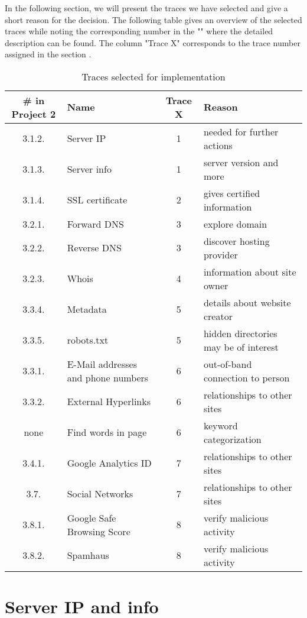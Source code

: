 \documentclass[
	a4paper,					10pt,							twoside,					openright,				notitlepage,			parskip=half,			]{scrreprt}
\begin{document}
In the following section, we will present the traces we have selected and give a short reason for the decision. 
The following table gives an overview of the selected traces while noting the
corresponding number in the "" where the detailed description
can be found. The column "Trace X" corresponds to the trace number assigned in the section . 
\begin{table}[H]
\begin{tabular}{ c | l | c | l }
\hline
\textbf{\# in Project 2} & \textbf{Name} & \textbf{Trace X} & \textbf{Reason} \\ \hline
3.1.2. & Server \gls{IP} & 1 & needed for further actions \\ \hline
3.1.3. & Server info & 1 & server version and more \\ \hline
3.1.4. & \gls{SSL} certificate & 2 & gives certified information \\ \hline
3.2.1. & Forward \gls{DNS} & 3 & explore domain \\ \hline
3.2.2. & Reverse \gls{DNS} & 3 & discover hosting provider \\ \hline
3.2.3. & Whois & 4 & information about site owner \\ \hline
3.3.4. & Metadata & 5 & details about website creator \\ \hline
3.3.5. & robots.txt & 5 & hidden directories may be of interest \\ \hline
3.3.1. & E-Mail addresses and phone numbers & 6 & out-of-band connection to person \\ \hline
3.3.2. & External Hyperlinks & 6 & relationships to other sites \\ \hline
none & Find words in page & 6 & keyword categorization \\ \hline
3.4.1. & Google Analytics ID & 7 & relationships to other sites \\ \hline
3.7. & Social Networks & 7 & relationships to other sites \\ \hline
3.8.1. & Google Safe Browsing Score & 8 & verify malicious activity \\ \hline
3.8.2. & Spamhaus & 8 & verify malicious activity \\ \hline
\hline
\end{tabular}
\caption{Traces selected for implementation}
\label{tab:traces-table}
\end{table}

\section{Server \gls{IP} and info}
\label{sec:seltraces_ServerIP}
\end{document}

